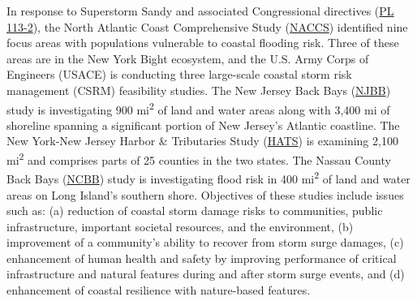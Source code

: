 \documentclass[
]{book}
\begin{document}
In response to Superstorm Sandy and associated Congressional directives (\href{https://www.congress.gov/113/plaws/publ2/PLAW-113publ2.pdf}{PL 113-2}), the North Atlantic Coast Comprehensive Study (\href{https://www.nad.usace.army.mil/CompStudy/}{NACCS}) identified nine focus areas with populations vulnerable to coastal flooding risk. Three of these areas are in the New York Bight ecosystem, and the U.S. Army Corps of Engineers (USACE) is conducting three large-scale coastal storm risk management (CSRM) feasibility studies. The New Jersey Back Bays (\href{https://www.nap.usace.army.mil/Missions/Civil-Works/New-Jersey-Back-Bays-Coastal-Storm-Risk-Management/}{NJBB}) study is investigating 900 mi\textsuperscript{2} of land and water areas along with 3,400 mi of shoreline spanning a significant portion of New Jersey's Atlantic coastline. The New York-New Jersey Harbor \& Tributaries Study (\href{https://www.nan.usace.army.mil/Missions/Civil-Works/Projects-in-New-York/New-York-New-Jersey-Harbor-Tributaries-Focus-Area-Feasibility-Study/}{HATS}) is examining 2,100 mi\textsuperscript{2} and comprises parts of 25 counties in the two states. The Nassau County Back Bays (\href{https://www.nap.usace.army.mil/Missions/Civil-Works/Nassau-County-Back-Bays-Study/}{NCBB}) study is investigating flood risk in 400 mi\textsuperscript{2} of land and water areas on Long Island's southern shore. Objectives of these studies include issues such as: (a) reduction of coastal storm damage risks to communities, public infrastructure, important societal resources, and the environment, (b) improvement of a community's ability to recover from storm surge damages, (c) enhancement of human health and safety by improving performance of critical infrastructure and natural features during and after storm surge events, and (d) enhancement of coastal resilience with nature-based features.
\end{document}
